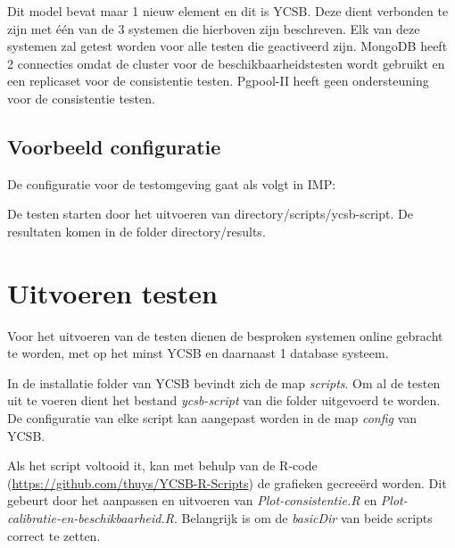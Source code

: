 \documentclass[]{article}
\begin{document}
Dit model bevat maar 1 nieuw element en dit is YCSB. Deze dient verbonden te zijn met één van de 3 systemen die hierboven zijn beschreven. Elk van deze systemen zal getest worden voor alle testen die geactiveerd zijn. MongoDB heeft 2 connecties omdat de cluster voor de beschikbaarheidstesten wordt gebruikt en een replicaset voor de consistentie testen. Pgpool-II heeft geen ondersteuning voor de consistentie testen. 

\subsection{Voorbeeld configuratie}

De configuratie voor de testomgeving gaat als volgt in IMP: 



De testen starten door het uitvoeren van {{directory}}/scripts/ycsb-script. De resultaten komen in de folder {{directory}}/results. 


\section{Uitvoeren testen}
Voor het uitvoeren van de testen dienen de besproken systemen online gebracht te worden, met op het minst YCSB en daarnaast 1 database systeem. 

In de installatie folder van YCSB bevindt zich de map \textit{scripts}. Om al de testen uit te voeren dient het bestand \textit{ycsb-script} van die folder uitgevoerd te worden. De configuratie van elke script kan aangepast worden in de map \textit{config} van YCSB. 

Als het script voltooid it, kan met behulp van de R-code (\url{https://github.com/thuys/YCSB-R-Scripts}) de grafieken gecreeërd worden. Dit gebeurt door het aanpassen en uitvoeren van \textit{Plot-consistentie.R} en \textit{Plot-calibratie-en-beschikbaarheid.R}. Belangrijk is om de \textit{basicDir} van beide scripts correct te zetten. 
\end{document}
